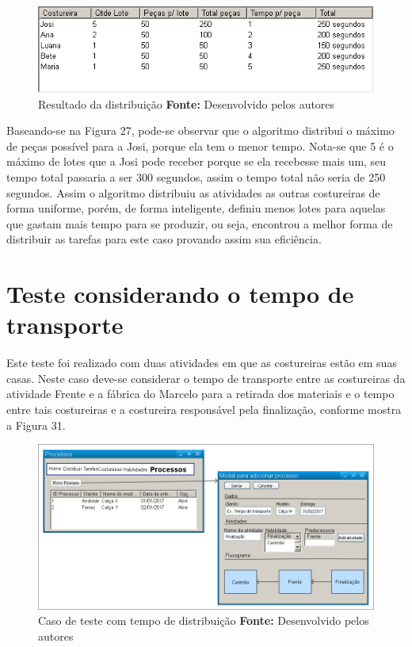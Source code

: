 \begin{figure}[h!]
	\centerline{\includegraphics[scale=0.6]{./imagens/test_case1_resultado.png}}
	\caption[Caso de teste Habilidade]
	{Resultado da distribuição \textbf{Fonte:} Desenvolvido pelos autores}
	\label{fig:exemplo1}
\end{figure}

\par Baseando-se na Figura 27, pode-se observar que o algoritmo distribui o máximo de peças possível para a Josi, porque
ela tem o menor tempo. Nota-se que 5 é o máximo de lotes que a Josi pode receber porque se ela recebesse mais um, seu 
tempo total passaria a ser 300 segundos, assim o tempo total não seria de 250 segundos. Assim o algoritmo distribuiu as 
atividades as outras costureiras de forma uniforme, porém, de forma inteligente, definiu menos lotes para aquelas que 
gastam mais tempo para se produzir, ou seja, encontrou a melhor forma de distribuir as tarefas para este caso provando assim
sua eficiência.

\section{Teste considerando o tempo de transporte}
\par Este teste foi realizado com duas atividades em que as costureiras estão em suas casas. Neste caso deve-se considerar
o tempo de transporte entre as costureiras da atividade Frente e a fábrica do Marcelo para a retirada dos materiais e o tempo 
entre tais costureiras e a costureira responsável pela finalização, conforme mostra a Figura 31.


\begin{figure}[h!]
	\centerline{\includegraphics[scale=0.3]{./imagens/test_case_2.png}}
	\caption[Caso de teste tempo]
	{Caso de teste com tempo de distribuição \textbf{Fonte:} Desenvolvido pelos autores}
	\label{fig:exemplo1}
\end{figure}


